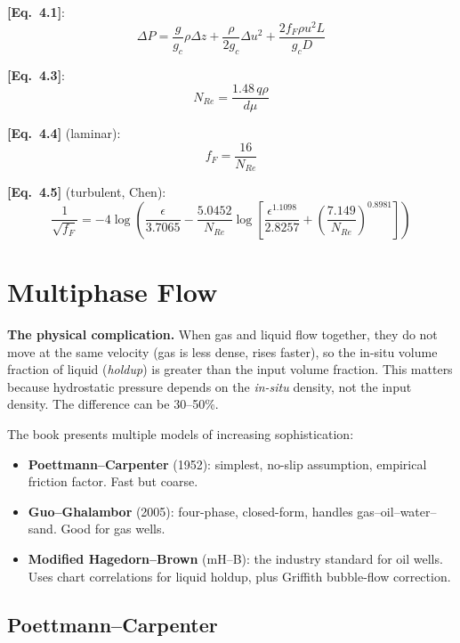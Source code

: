 \documentclass[11pt,a4paper,openany]{book}
\newcommand{\eqrefbook}[1]{\textcolor{blue!60!black}{\textbf{[Eq.~#1]}}}
\begin{document}
\eqrefbook{4.1}:
\begin{equation}
  \Delta P = \frac{g}{g_c}\rho\Delta z + \frac{\rho}{2g_c}\Delta u^2
  + \frac{2f_F\rho u^2 L}{g_c D}
\end{equation}

\eqrefbook{4.3}:
\begin{equation}
  N_{Re} = \frac{1.48\,q\rho}{d\mu}
\end{equation}

\eqrefbook{4.4} (laminar):
\begin{equation}
  f_F = \frac{16}{N_{Re}}
\end{equation}

\eqrefbook{4.5} (turbulent, Chen):
\begin{equation}
  \frac{1}{\sqrt{f_F}} = -4\log\left(\frac{\epsilon}{3.7065} -
  \frac{5.0452}{N_{Re}}\log\left[\frac{\epsilon^{1.1098}}{2.8257}
  + \left(\frac{7.149}{N_{Re}}\right)^{0.8981}\right]\right)
\end{equation}

\section{Multiphase Flow}

\begin{theory}
\textbf{The physical complication.} When gas and liquid flow together,
they do not move at the same velocity (gas is less dense, rises
faster), so the in-situ volume fraction of liquid (\emph{holdup}) is
greater than the input volume fraction. This matters because
hydrostatic pressure depends on the \emph{in-situ} density, not the
input density. The difference can be 30--50\%.

The book presents multiple models of increasing sophistication:
\begin{itemize}
  \item \textbf{Poettmann--Carpenter} (1952): simplest, no-slip
        assumption, empirical friction factor. Fast but coarse.
  \item \textbf{Guo--Ghalambor} (2005): four-phase, closed-form,
        handles gas--oil--water--sand. Good for gas wells.
  \item \textbf{Modified Hagedorn--Brown} (mH--B): the industry
        standard for oil wells. Uses chart correlations for liquid
        holdup, plus Griffith bubble-flow correction.
\end{itemize}
\end{theory}

\subsection{Poettmann--Carpenter}
\end{document}
